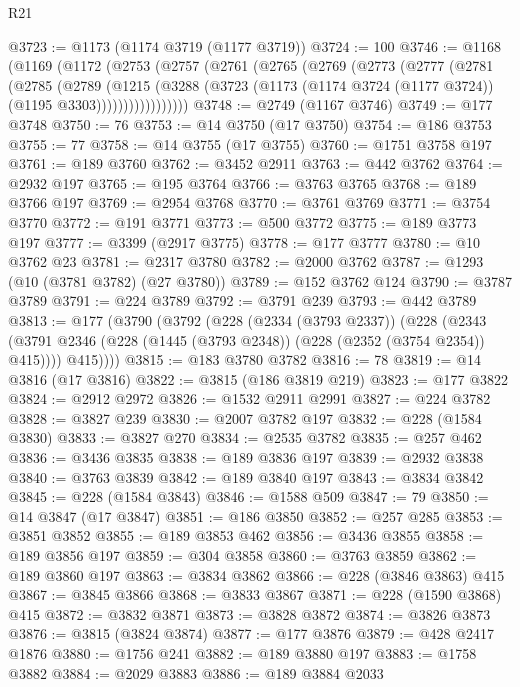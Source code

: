 \begin{lexlean}{R21}
\begin{coremodule}
@3723 := @1173 (@1174 @3719 (@1177 @3719))
@3724 := 100
@3746 := @1168
    (@1169
      (@1172
        (@2753
          (@2757
            (@2761
              (@2765
                (@2769
                  (@2773
                    (@2777
                      (@2781
                        (@2785
                          (@2789
                            (@1215
                              (@3288
                                (@3723
                                  (@1173 (@1174 @3724 (@1177 @3724)) (@1195 @3303)))))))))))))))))
@3748 := @2749 (@1167 @3746)
@3749 := @177 @3748
@3750 := 76
@3753 := @14 @3750 (@17 @3750)
@3754 := @186 @3753
@3755 := 77
@3758 := @14 @3755 (@17 @3755)
@3760 := @1751 @3758 @197
@3761 := @189 @3760
@3762 := @3452 @2911
@3763 := @442 @3762
@3764 := @2932 @197
@3765 := @195 @3764
@3766 := @3763 @3765
@3768 := @189 @3766 @197
@3769 := @2954 @3768
@3770 := @3761 @3769
@3771 := @3754 @3770
@3772 := @191 @3771
@3773 := @500 @3772
@3775 := @189 @3773 @197
@3777 := @3399 (@2917 @3775)
@3778 := @177 @3777
@3780 := @10 @3762 @23
@3781 := @2317 @3780
@3782 := @2000 @3762
@3787 := @1293 (@10 (@3781 @3782) (@27 @3780))
@3789 := @152 @3762 @124
@3790 := @3787 @3789
@3791 := @224 @3789
@3792 := @3791 @239
@3793 := @442 @3789
@3813 := @177
    (@3790
      (@3792
        (@228
          (@2334 (@3793 @2337))
          (@228
            (@2343 (@3791 @2346 (@228 (@1445 (@3793 @2348)) (@228 (@2352 (@3754 @2354)) @415))))
            @415))))
@3815 := @183 @3780 @3782
@3816 := 78
@3819 := @14 @3816 (@17 @3816)
@3822 := @3815 (@186 @3819 @219)
@3823 := @177 @3822
@3824 := @2912 @2972
@3826 := @1532 @2911 @2991
@3827 := @224 @3782
@3828 := @3827 @239
@3830 := @2007 @3782 @197
@3832 := @228 (@1584 @3830)
@3833 := @3827 @270
@3834 := @2535 @3782
@3835 := @257 @462
@3836 := @3436 @3835
@3838 := @189 @3836 @197
@3839 := @2932 @3838
@3840 := @3763 @3839
@3842 := @189 @3840 @197
@3843 := @3834 @3842
@3845 := @228 (@1584 @3843)
@3846 := @1588 @509
@3847 := 79
@3850 := @14 @3847 (@17 @3847)
@3851 := @186 @3850
@3852 := @257 @285
@3853 := @3851 @3852
@3855 := @189 @3853 @462
@3856 := @3436 @3855
@3858 := @189 @3856 @197
@3859 := @304 @3858
@3860 := @3763 @3859
@3862 := @189 @3860 @197
@3863 := @3834 @3862
@3866 := @228 (@3846 @3863) @415
@3867 := @3845 @3866
@3868 := @3833 @3867
@3871 := @228 (@1590 @3868) @415
@3872 := @3832 @3871
@3873 := @3828 @3872
@3874 := @3826 @3873
@3876 := @3815 (@3824 @3874)
@3877 := @177 @3876
@3879 := @428 @2417 @1876
@3880 := @1756 @241
@3882 := @189 @3880 @197
@3883 := @1758 @3882
@3884 := @2029 @3883
@3886 := @189 @3884 @2033

\end{coremodule}
\end{lexlean}
